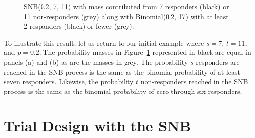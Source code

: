 \documentclass[sii]{ipart}
\begin{document}
\begin{figure}[htbp!]
\centering
{}
\hfill
{}
\caption{
SNB(0.2, 7, 11) with mass contributed from 
7 responders (black) or 11 non-responders (grey) along with 
Binomial(0.2, 17) with at least 2 responders (black) or fewer (grey).
}
\label{fig:snb_bin_compare}
\end{figure}

To illustrate this result, let us return to our initial example
where $s=7$, $t=11$, and $p=0.2$.  The probability masses in
Figure~\ref{fig:snb_bin_compare} represented in 
black are equal in panels (a) and (b) as are the masses in grey.
The probability $s$
responders are reached in the SNB process is the same as the binomial 
probability of at least seven responders. Likewise, the probability $t$ 
non-responders reached in the SNB process is the same as the binomial
probability of zero through six responders.

\section{Trial Design with the SNB}
\end{document}
